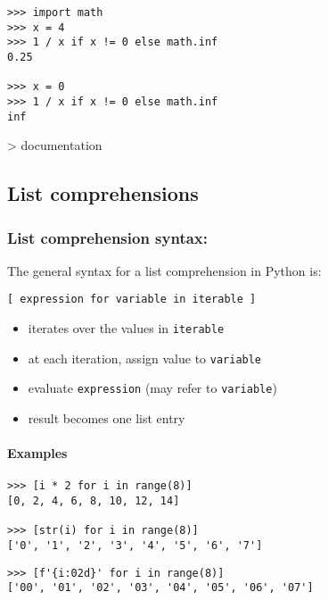 \documentclass[12pt]{article}
\begin{document}
\begin{lstlisting}
>>> import math
>>> x = 4
>>> 1 / x if x != 0 else math.inf
0.25

>>> x = 0
>>> 1 / x if x != 0 else math.inf
inf
\end{lstlisting}

\textgreater{} documentation





\subsection{List comprehensions}

\subsubsection{List comprehension syntax:}
The general syntax for a list comprehension in Python is:
\begin{center}
\texttt{[ expression for variable in iterable ]}
\end{center}
\begin{itemize}
  \item iterates over the values in \texttt{iterable}
  \item at each iteration, assign value to \texttt{variable}
  \item evaluate \texttt{expression} (may refer to \texttt{variable})
  \item result becomes one list entry
\end{itemize}

\paragraph{Examples}
\begin{verbatim}
>>> [i * 2 for i in range(8)]
[0, 2, 4, 6, 8, 10, 12, 14]

>>> [str(i) for i in range(8)]
['0', '1', '2', '3', '4', '5', '6', '7']
\end{verbatim}



\verb|>>> [f'{i:02d}' for i in range(8)]|\\
\verb|['00', '01', '02', '03', '04', '05', '06', '07']|
\end{document}
